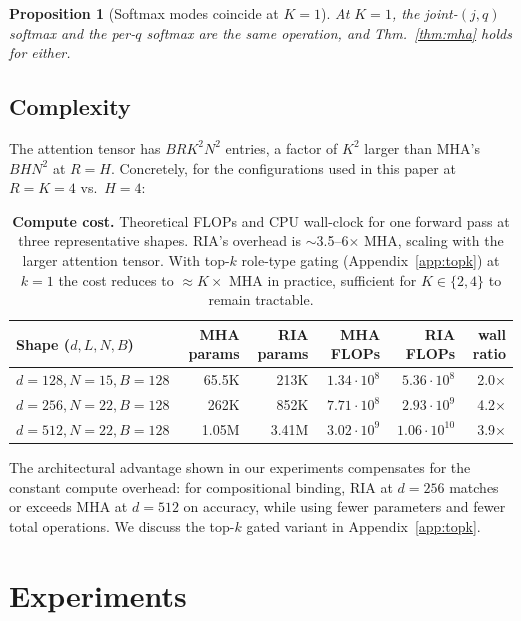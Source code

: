 \documentclass{article}
\newtheorem{proposition}{Proposition}
\begin{document}
\begin{proposition}[Softmax modes coincide at $K=1$]
\label{prop:joint-softmax}
At $K=1$, the joint-$(j, q)$ softmax and the per-$q$ softmax are the
same operation, and Thm.~\ref{thm:mha} holds for either.
\end{proposition}

\subsection{Complexity}
\label{sec:complexity}

The attention tensor has $B R K^2 N^2$ entries, a factor of $K^2$
larger than MHA's $B H N^2$ at $R{=}H$. Concretely, for the
configurations used in this paper at $R{=}K{=}4$ vs.\ $H{=}4$:

\begin{table}[h]
\centering
\caption{\textbf{Compute cost.} Theoretical FLOPs and CPU wall-clock
for one forward pass at three representative shapes. RIA's overhead
is $\sim$3.5--6$\times$ MHA, scaling with the larger attention
tensor. With top-$k$ role-type gating (Appendix~\ref{app:topk}) at
$k{=}1$ the cost reduces to $\approx K\times$ MHA in practice,
sufficient for $K \in \{2, 4\}$ to remain tractable.}
\label{tab:flops}
\small
\begin{tabular}{lrrrrr}
\toprule
Shape ($d, L, N, B$) & MHA params & RIA params &
  MHA FLOPs & RIA FLOPs & wall ratio \\
\midrule
$d{=}128, N{=}15, B{=}128$  & 65.5K  & 213K  & $1.34{\cdot}10^8$ & $5.36{\cdot}10^8$ & 2.0$\times$ \\
$d{=}256, N{=}22, B{=}128$  & 262K   & 852K  & $7.71{\cdot}10^8$ & $2.93{\cdot}10^9$ & 4.2$\times$ \\
$d{=}512, N{=}22, B{=}128$  & 1.05M  & 3.41M & $3.02{\cdot}10^9$ & $1.06{\cdot}10^{10}$ & 3.9$\times$ \\
\bottomrule
\end{tabular}
\end{table}

The architectural advantage shown in our experiments compensates for
the constant compute overhead: for compositional binding, RIA at
$d{=}256$ matches or exceeds MHA at $d{=}512$ on accuracy, while using
fewer parameters and fewer total operations. We discuss the top-$k$
gated variant in Appendix~\ref{app:topk}.

\section{Experiments}
\label{sec:experiments}
\end{document}
